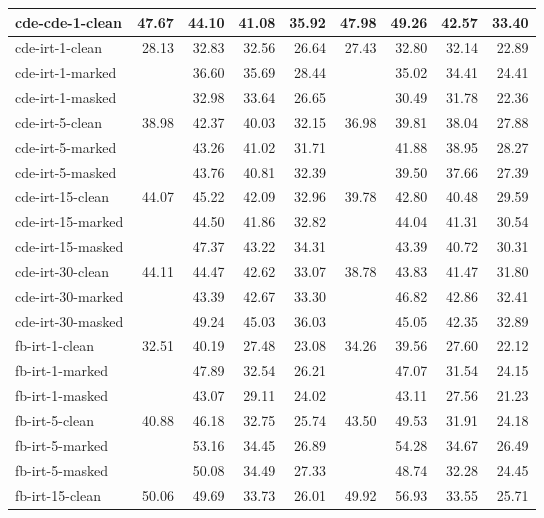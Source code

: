 \begin{tabular}{| l | r | r | r | r | r | r | r | r |}
    cde-cde-1-clean    & 47.67 & 44.10 & 41.08 & 35.92 & 47.98 & 49.26 & 42.57 & 33.40 \\ \hline
    cde-irt-1-clean    & 28.13 & 32.83 & 32.56 & 26.64 & 27.43 & 32.80 & 32.14 & 22.89 \\
    cde-irt-1-marked   &       & 36.60 & 35.69 & 28.44 &       & 35.02 & 34.41 & 24.41 \\
    cde-irt-1-masked   &       & 32.98 & 33.64 & 26.65 &       & 30.49 & 31.78 & 22.36 \\ \hline
    cde-irt-5-clean    & 38.98 & 42.37 & 40.03 & 32.15 & 36.98 & 39.81 & 38.04 & 27.88 \\
    cde-irt-5-marked   &       & 43.26 & 41.02 & 31.71 &       & 41.88 & 38.95 & 28.27 \\
    cde-irt-5-masked   &       & 43.76 & 40.81 & 32.39 &       & 39.50 & 37.66 & 27.39 \\ \hline
    cde-irt-15-clean   & 44.07 & 45.22 & 42.09 & 32.96 & 39.78 & 42.80 & 40.48 & 29.59 \\
    cde-irt-15-marked  &       & 44.50 & 41.86 & 32.82 &       & 44.04 & 41.31 & 30.54 \\
    cde-irt-15-masked  &       & 47.37 & 43.22 & 34.31 &       & 43.39 & 40.72 & 30.31 \\ \hline
    cde-irt-30-clean   & 44.11 & 44.47 & 42.62 & 33.07 & 38.78 & 43.83 & 41.47 & 31.80 \\
    cde-irt-30-marked  &       & 43.39 & 42.67 & 33.30 &       & 46.82 & 42.86 & 32.41 \\
    cde-irt-30-masked  &       & 49.24 & 45.03 & 36.03 &       & 45.05 & 42.35 & 32.89 \\ \hline \hline
    fb-irt-1-clean     & 32.51 & 40.19 & 27.48 & 23.08 & 34.26 & 39.56 & 27.60 & 22.12 \\
    fb-irt-1-marked    &       & 47.89 & 32.54 & 26.21 &       & 47.07 & 31.54 & 24.15 \\
    fb-irt-1-masked    &       & 43.07 & 29.11 & 24.02 &       & 43.11 & 27.56 & 21.23 \\ \hline
    fb-irt-5-clean     & 40.88 & 46.18 & 32.75 & 25.74 & 43.50 & 49.53 & 31.91 & 24.18 \\
    fb-irt-5-marked    &       & 53.16 & 34.45 & 26.89 &       & 54.28 & 34.67 & 26.49 \\
    fb-irt-5-masked    &       & 50.08 & 34.49 & 27.33 &       & 48.74 & 32.28 & 24.45 \\ \hline
    fb-irt-15-clean    & 50.06 & 49.69 & 33.73 & 26.01 & 49.92 & 56.93 & 33.55 & 25.71 \\

\end{tabular}
